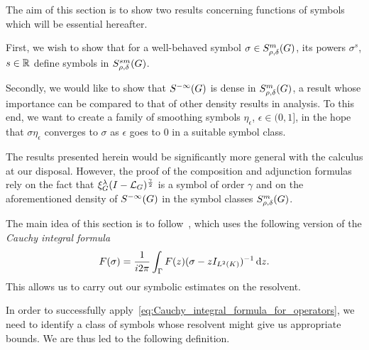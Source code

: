 The aim of this section is to show two results concerning functions of symbols which will be essential hereafter.

First, we wish to show that for a well-behaved symbol $\sigma \in S^{m}_{\rho, \delta}(G)$,
its powers $\sigma^s$, $s \in \mathbb{R}$ define symbols in $S^{s m}_{\rho, \delta}(G)$.

Secondly, we would like to show that ${S^{-\infty} (G)}$ is dense in $S^{m}_{\rho, \delta}(G)$,
a result whose importance can be compared to that of other density results in analysis.
To this end, we want to create a family of smoothing symbols $\eta_\epsilon$, $\epsilon \in (0, 1]$, in the hope
that $\sigma \eta_\epsilon$ converges to $\sigma$ as $\epsilon$ goes to $0$ in a suitable symbol class.

The results presented herein would be significantly more general with the calculus at our disposal.
However, the proof of the composition and adjunction formulas rely on the fact that $\xi^{\lambda}_{G} (I - {\mathcal{L}_{G}})^\frac{\gamma}{2}$ is a symbol of order $\gamma$
and on the aforementioned density of ${S^{-\infty} (G)}$ in the symbol classes $S^{m}_{\rho, \delta}(G)$.

The main idea of this section is to follow~\cite{RuzhanskyWirth14},
which uses the following version of the \emph{Cauchy integral formula}
\begin{align}
    F(\sigma) = \frac 1 {i 2 \pi} \int_\Gamma F(z) (\sigma - z{I_{{L^{2} (K)}}})^{-1} \,\mathrm{d} z.
    \label{eq:Cauchy_integral_formula_for_operators}
\end{align}
This allows us to carry out our symbolic estimates on the resolvent.

In order to successfully apply~\eqref{eq:Cauchy_integral_formula_for_operators},
we need to identify a class of symbols whose resolvent might give us appropriate bounds.
We are thus led to the following definition.

